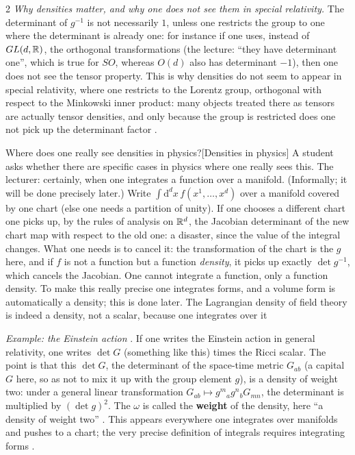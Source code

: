\begin{paracol}{2}
\emph{Why densities matter, and why one does not see them in special relativity.} The determinant of $g^{-1}$ is not necessarily $1$, unless one restricts the group to one where the determinant is already one: for instance if one uses, instead of $GL(d,\mathbb{R})$, the orthogonal transformations (the lecture: ``they have determinant one'', which is true for $SO$, whereas $O(d)$ also has determinant $-1$), then one does not see the tensor property. This is why densities do not seem to appear in special relativity, where one restricts to the Lorentz group, orthogonal with respect to the Minkowski inner product: many objects treated there as tensors are actually tensor densities, and only because the group is restricted does one not pick up the determinant factor    .
\begin{answer}{Where does one really see densities in physics?}[Densities in physics]
A student asks whether there are specific cases in physics where one really sees this. The lecturer: certainly, when one integrates a function over a manifold. (Informally; it will be done precisely later.) Write $\int\!\mathrm d^dx\,f(x^1,\dots,x^d)$ over a manifold covered by one chart (else one needs a partition of unity). If one chooses a different chart one picks up, by the rules of analysis on $\mathbb{R}^d$, the Jacobian determinant of the new chart map with respect to the old one: a disaster, since the value of the integral changes. What one needs is to cancel it: the transformation of the chart is the $g$ here, and if $f$ is not a function but a function \emph{density}, it picks up exactly $\det g^{-1}$, which cancels the Jacobian. One cannot integrate a function, only a function density. To make this really precise one integrates forms, and a volume form is automatically a density; this is done later. The Lagrangian density of field theory is indeed a density, not a scalar, because one integrates over it          
\end{answer}
\emph{Example: the Einstein action}  . If one writes the Einstein action in general relativity, one writes $\det G$ (something like this) times the Ricci scalar. The point is that this $\det G$, the determinant of the space-time metric $G_{ab}$ (a capital $G$ here, so as not to mix it up with the group element $g$), is a density of weight two: under a general linear transformation $G_{ab}\mapsto g^m{}_ag^n{}_bG_{mn}$, the determinant is multiplied by $(\det g)^2$. The $\omega$ is called the \textbf{weight} of the density, here ``a density of weight two''     . This appears everywhere one integrates over manifolds and pushes to a chart; the very precise definition of integrals requires integrating forms  .

\end{paracol}

